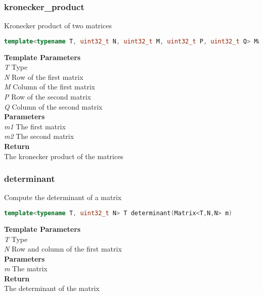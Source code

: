 \subsubsection{kronecker\_product}
\begin{mdframed}
Kronecker product of two matrices
\begin{lstlisting}[language=C++]
template<typename T, uint32_t N, uint32_t M, uint32_t P, uint32_t Q> Matrix<T,N*P,M*Q> kronecker_product(const Matrix<T,N,M>& m1, const Matrix<T,P,Q>& m2) 
\end{lstlisting}
\textbf{Template Parameters} \\ 
\textit{T} Type \\ 
\textit{N} Row of the first matrix \\ 
\textit{M} Column of the first matrix \\ 
\textit{P} Row of the second matrix \\ 
\textit{Q} Column of the second matrix \\ 
\textbf{Parameters} \\ 
\textit{m1} The first matrix \\ 
\textit{m2} The second matrix \\ 
\textbf{Return} \\ 
The kronecker product of the matrices\\ 
\end{mdframed}

\subsubsection{determinant}
\begin{mdframed}
Compute the determinant of a matrix
\begin{lstlisting}[language=C++]
template<typename T, uint32_t N> T determinant(Matrix<T,N,N> m) 
\end{lstlisting}
\textbf{Template Parameters} \\ 
\textit{T} Type \\ 
\textit{N} Row and column of the first matrix \\ 
\textbf{Parameters} \\ 
\textit{m} The matrix \\ 
\textbf{Return} \\ 
The determinant of the matrix\\ 
\end{mdframed}

